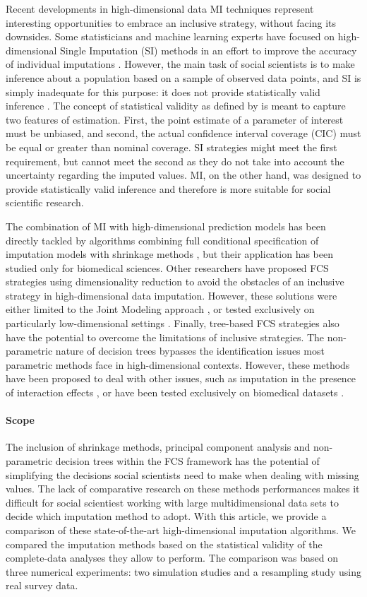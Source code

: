 Recent developments in high-dimensional data MI techniques represent interesting opportunities to embrace an 
inclusive strategy, without facing its downsides.
Some statisticians and machine learning experts have focused on high-dimensional Single Imputation (SI) methods in 
an effort to improve the accuracy of individual imputations \citep[e.g.][]{kimEtAl:2005, stekhovenBuhlmann:2011, 
d'ambrosioEtAl:2012}. 
However, the main task of social scientists is to make inference about a population based on a sample of observed 
data points, and SI is simply inadequate for this purpose: it does not provide statistically valid 
inference \citep{rubin:1996}.
The concept of statistical validity as defined by \citep{rubin:1996} is meant to capture two features of 
estimation.
First, the point estimate of a parameter of interest must be unbiased, and second, the actual 
confidence interval coverage (CIC) must be equal or greater than nominal coverage.
SI strategies might meet the first requirement, but cannot meet the second as they 
do not take into account the uncertainty regarding the imputed values.
MI, on the other hand, was designed to provide statistically valid inference and therefore is 
more suitable for social scientific research.

The combination of MI with high-dimensional prediction models has been directly tackled by algorithms combining 
full conditional specification of imputation models with shrinkage methods \citep{zhaoLong:2016, dengEtAl:2016},
but their application has been studied only for biomedical sciences.
Other researchers have proposed FCS strategies using dimensionality reduction to avoid the obstacles of an inclusive
strategy in high-dimensional data imputation.
However, these solutions were either limited to the Joint Modeling approach \citep{songBelin:2004}, 
or tested exclusively on particularly low-dimensional settings \citep{howardEtAl:2015}.
Finally, tree-based FCS strategies also have the potential to overcome the limitations of inclusive strategies.
The non-parametric nature of decision trees bypasses the identification issues most parametric methods face
in high-dimensional contexts.
However, these methods have been proposed to deal with other issues, such as imputation in the presence
of interaction effects \citep{dooveEtAl:2014}, or have been tested exclusively on biomedical datasets 
\citep{shahEtAl:2014}.
%
\paragraph{Scope}
The inclusion of shrinkage methods, principal component analysis and non-parametric decision trees within the FCS framework 
has the potential of simplifying the decisions social scientists need to make when dealing with missing values.
The lack of comparative research on these methods performances makes it difficult for social scientiest working with large
multidimensional data sets to decide which imputation method to adopt.
With this article, we provide a comparison of these state-of-the-art high-dimensional imputation algorithms.
We compared the imputation methods based on the statistical validity of the complete-data analyses they allow to perform.
The comparison was based on three numerical experiments: two simulation studies and a resampling study using real survey 
data.
%
